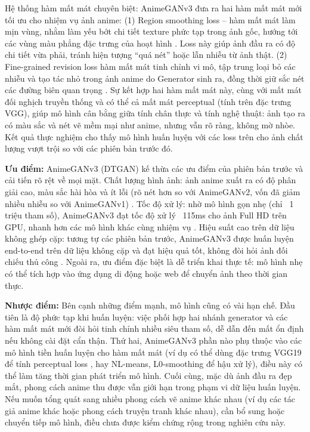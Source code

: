Hệ thống hàm mất mát chuyên biệt: AnimeGANv3 đưa ra hai hàm mất mát mới tối ưu cho nhiệm vụ ảnh
anime: (1) Region smoothing loss – hàm mất mát làm mịn vùng, nhằm làm yếu bớt chi tiết texture phức
tạp trong ảnh gốc, hướng tới các vùng màu phẳng đặc trưng của hoạt hình \cite{Liu2024}. Loss này giúp ảnh đầu ra có
độ chi tiết vừa phải, tránh hiện tượng “quá nét” hoặc lẫn nhiễu từ ảnh thật. (2) Fine-grained revision loss 
hàm mất mát tinh chỉnh vi mô, tập trung loại bỏ các nhiễu và tạo tác nhỏ trong ảnh anime do Generator
sinh ra, đồng thời giữ sắc nét các đường biên quan trọng \cite{Liu2024}. Sự kết hợp hai hàm mất mát này, cùng với
mất mát đối nghịch truyền thống và có thể cả mất mát perceptual (tính trên đặc trưng VGG), giúp mô hình
cân bằng giữa tính chân thực và tính nghệ thuật: ảnh tạo ra có màu sắc và nét vẽ mềm mại như anime,
nhưng vẫn rõ ràng, không mờ nhòe. Kết quả thực nghiệm cho thấy mô hình huấn luyện với các loss trên
cho ảnh chất lượng vượt trội so với các phiên bản trước đó.

\textbf{Ưu điểm:} AnimeGANv3 (DTGAN) kế thừa các ưu điểm của phiên bản trước và cải tiến rõ rệt về mọi mặt.
Chất lượng hình ảnh: ảnh anime xuất ra có độ phân giải cao, màu sắc hài hòa và ít lỗi (rõ nét hơn so với
AnimeGANv2, vốn đã giảm nhiều nhiễu so với AnimeGANv1) \cite{Liu2024}. Tốc độ xử lý: nhờ mô hình gọn nhẹ (chỉ ~1
triệu tham số), AnimeGANv3 đạt tốc độ xử lý ~115ms cho ảnh Full HD trên GPU, nhanh hơn các mô hình
khác cùng nhiệm vụ \cite{Liu2024}. Hiệu suất cao trên dữ liệu không ghép cặp: tương tự các phiên bản trước,
AnimeGANv3 được huấn luyện end-to-end trên dữ liệu không cặp và đạt hiệu quả tốt, không đòi hỏi ảnh đối
chiếu thủ công \cite{Liu2024}. Ngoài ra, ưu điểm đặc biệt là dễ triển khai thực tế: mô hình nhẹ có thể tích hợp vào
ứng dụng di động hoặc web để chuyển ảnh theo thời gian thực.

\textbf{Nhược điểm:} Bên cạnh những điểm mạnh, mô hình cũng có vài hạn chế. Đầu tiên là độ phức tạp khi huấn
luyện: việc phối hợp hai nhánh generator và các hàm mất mát mới đòi hỏi tinh chỉnh nhiều siêu tham số, dễ
dẫn đến mất ổn định nếu không cài đặt cẩn thận. Thứ hai, AnimeGANv3 phần nào phụ thuộc vào các mô
hình tiền huấn luyện cho hàm mất mát (ví dụ có thể dùng đặc trưng VGG19 để tính perceptual loss \cite{Liu2024}, hay
NL-means, L0-smoothing để hậu xử lý), điều này có thể làm tăng thời gian phát triển mô hình. Cuối
cùng, mặc dù ảnh đầu ra đẹp mắt, phong cách anime thu được vẫn giới hạn trong phạm vi dữ liệu huấn
luyện. Nếu muốn tổng quát sang nhiều phong cách vẽ anime khác nhau (ví dụ các tác giả anime khác hoặc
phong cách truyện tranh khác nhau), cần bổ sung hoặc chuyển tiếp mô hình, điều chưa được kiểm chứng
rộng trong nghiên cứu này.

